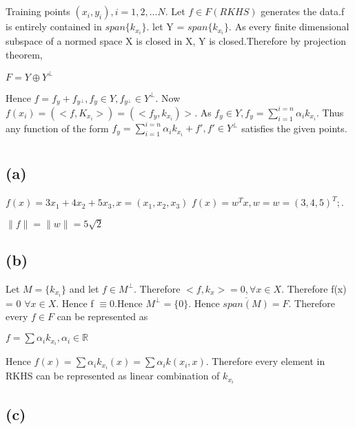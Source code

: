 \documentclass[12pt,a4paper]{article}
\begin{document}
	 \section{}
	 Training points $(x_i, y_i), i=1,2,...N $. Let $ f \in F(RKHS) $ generates the data.f is entirely contained in $span\{k_{x_i}\}$. let Y = $span\{k_{x_i}\}$. As every finite dimensional subspace of a normed space
	 X is closed in X, Y is closed.Therefore by projection theorem,
	 \begin{center}
	   $	F = Y \oplus Y^\perp $ 
	 \end{center}
	 Hence $ f = f_y + f_{y^\perp}, f_y \in Y, f_{y^\perp} \in Y^{\perp} $. Now $f(x_i) = ({<f, K_{x_i}>}) = (<f_y, k_{x_i})>$. As $ f_y \in Y, f_y = \sum_{i=1}^{i=n} \alpha_i k_{x_i}$. Thus any function of the form $f_y = \sum_{i=1}^{i=n} \alpha_i k_{x_i} + f', f' \in Y^{\perp}$ satisfies the given points.
	 
	 \section{}
	 \subsection*{(a)}
	 $f(x) = 3x_1+4x_2+5x_3, x=(x_1,x_2,x_3)$
	 $f(x) = w^T x, w = w = (3,4,5)^T; $. 
	 \begin{center}
	 	$\|f\| = \|w\| = 5\sqrt{2}$
	 \end{center}
	 
	 \subsection*{(b)}
	 Let $M = \{k_{x_i}\}$ and let $ f \in M^{\perp} $. Therefore $ <f,k_x> = 0, \forall x \in X$. Therefore f(x) = 0 $\forall x \in X$. Hence f $\equiv 0 $.Hence $ M^{\perp} = \{0\} $. Hence $ \overline{span(M)}=F $. Therefore every $ f \in F $ can be represented as 
	 \begin{center}
	 	$f = \sum \alpha_i k_{x_i}, \alpha_i \in \mathbb{R}$ 
	 \end{center} 
	 Hence $f(x) = \sum \alpha_i k_{x_i}(x) = \sum \alpha_i k(x_i,x) $. Therefore every element in RKHS can be represented as linear combination of $k_{x_i}$
	 
	 \subsection*{(c)}
\end{document}
